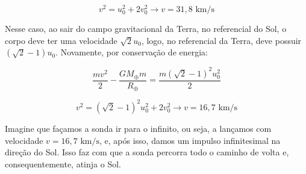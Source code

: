 \documentclass[11pt]{article}
\begin{document}
\begin{pproblem}
\begin{pssolution*}{}{}
\begin{alternativas}
            \[v^2=u_0^2+2v_0^2 \rightarrow \boxed{v = 31,8\text{ km/s}}\]

            \item Nesse caso, ao sair do campo gravitacional da Terra, no referencial do Sol, o corpo deve ter uma velocidade \(\sqrt{2}u_0\), logo, no referencial da Terra, deve possuir \((\sqrt{2}-1)u_0\). Novamente, por conservação de energia:
            
            \[\frac{mv^2}{2}-\frac{GM_\oplus m}{R_\oplus} = \frac{m(\sqrt{2}-1)^2u_0^2}{2}\]

            \[v^2 = (\sqrt{2}-1)^2u_0^2+2v_0^2 \rightarrow \boxed{v = 16,7 \text{ km/s}}\]

            \item Imagine que façamos a sonda ir para o infinito, ou seja, a lançamos com velocidade \(v=16,7\text{ km/s}\), e, após isso, damos um impulso infinitesimal na direção do Sol. Isso faz com que a sonda percorra todo o caminho de volta e, consequentemente, atinja o Sol.
        \end{alternativas}
    \end{pssolution*}
\end{pproblem}
\end{document}
